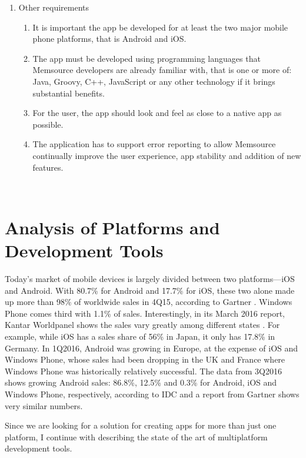 \begin{enumerate}
\begin{enumerate}[label*=\arabic*.]
	\end{enumerate}
	
	
	
	\item Other requirements
	\begin{enumerate}[label*=\arabic*.]
		\item It is important the app be developed for at least the two major mobile phone platforms, that is Android and iOS.
		\item The app must be developed using programming languages that Memsource developers are already familiar with, that is one or more of: Java, Groovy, C++, JavaScript or any other technology if it brings substantial benefits.
		\item For the user, the app should look and feel as close to a native app as possible.
		\item The application has to support error reporting to allow Memsource continually improve the user experience, app stability and addition of new features.
	\end{enumerate}
	
\end{enumerate}
~


\section{Analysis of Platforms and Development Tools}

Today's market of mobile devices is largely divided between two platforms---iOS and Android. With 80.7\% for Android and 17.7\% for iOS, these two alone made up more than 98\% of worldwide sales in 4Q15, according to Gartner \cite{gartner}. Windows Phone comes third with 1.1\% of sales. Interestingly, in its March 2016 report, Kantar Worldpanel shows the sales vary greatly among different states \cite{kantar}. For example, while iOS has a sales share of 56\% in Japan, it only has 17.8\% in Germany. In 1Q2016, Android was growing in Europe, at the expense of iOS and Windows Phone, whose sales had been dropping in the UK and France where Windows Phone was historically relatively successful. The data from 3Q2016 shows growing Android sales: 86.8\%, 12.5\% and 0.3\% for Android, iOS and Windows Phone, respectively, according to IDC \cite{idc:marketShare} and a report from Gartner \cite{gartner2} shows very similar numbers.


Since we are looking for a solution for creating apps for more than just one platform, I continue with describing the state of the art of multiplatform development tools.

